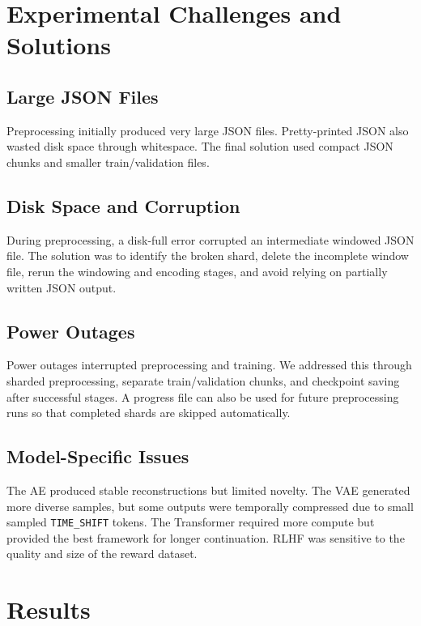 \documentclass{article}
\begin{document}
\section{Experimental Challenges and Solutions}

\subsection{Large JSON Files}
Preprocessing initially produced very large JSON files. Pretty-printed JSON also wasted disk space through whitespace. The final solution used compact JSON chunks and smaller train/validation files.

\subsection{Disk Space and Corruption}
During preprocessing, a disk-full error corrupted an intermediate windowed JSON file. The solution was to identify the broken shard, delete the incomplete window file, rerun the windowing and encoding stages, and avoid relying on partially written JSON output.

\subsection{Power Outages}
Power outages interrupted preprocessing and training. We addressed this through sharded preprocessing, separate train/validation chunks, and checkpoint saving after successful stages. A progress file can also be used for future preprocessing runs so that completed shards are skipped automatically.

\subsection{Model-Specific Issues}
The AE produced stable reconstructions but limited novelty. The VAE generated more diverse samples, but some outputs were temporally compressed due to small sampled \texttt{TIME\_SHIFT} tokens. The Transformer required more compute but provided the best framework for longer continuation. RLHF was sensitive to the quality and size of the reward dataset.

\section{Results}
\end{document}
